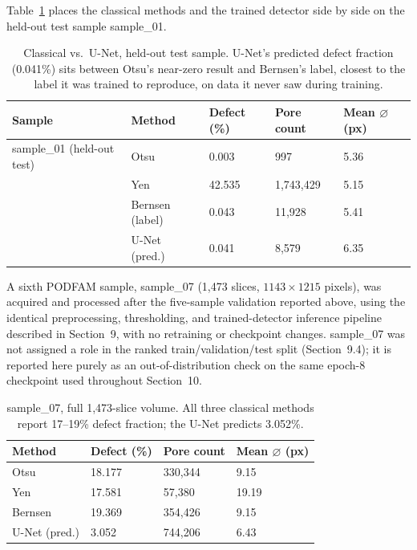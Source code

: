 Table~\ref{tab:podfam_unified} places the classical methods and the trained detector side by side on
the held-out test sample sample\_01.

\begin{table}[htbp]
\centering
\caption{Classical vs.\ U-Net, held-out test sample. U-Net's predicted defect fraction (0.041\%)
  sits between Otsu's near-zero result and Bernsen's label, closest to the label it was trained to
  reproduce, on data it never saw during training.}
\label{tab:podfam_unified}
\begin{tabular}{lllll}
\toprule
\textbf{Sample} & \textbf{Method} & \textbf{Defect (\%)} & \textbf{Pore count} & \textbf{Mean $\varnothing$ (px)} \\
\midrule
sample\_01 (held-out test) & Otsu             & 0.003  & 997       & 5.36 \\
                            & Yen              & 42.535 & 1,743,429 & 5.15 \\
                            & Bernsen (label)  & 0.043  & 11,928    & 5.41 \\
                            & U-Net (pred.)    & 0.041  & 8,579     & 6.35 \\
\bottomrule
\end{tabular}
\end{table}

A sixth PODFAM sample, sample\_07 (1,473 slices, $1143\times1215$ pixels), was acquired and processed
after the five-sample validation reported above, using the identical preprocessing, thresholding, and
trained-detector inference pipeline described in Section~9, with no retraining or checkpoint changes.
sample\_07 was not assigned a role in the ranked train/validation/test split (Section~9.4); it is
reported here purely as an out-of-distribution check on the same epoch-8 checkpoint used throughout
Section~10.

\begin{table}[htbp]
\centering
\caption{sample\_07, full 1,473-slice volume. All three classical methods report 17--19\% defect
  fraction; the U-Net predicts 3.052\%.}
\label{tab:sample07_classical}
\begin{tabular}{llll}
\toprule
\textbf{Method} & \textbf{Defect (\%)} & \textbf{Pore count} & \textbf{Mean $\varnothing$ (px)} \\
\midrule
Otsu           & 18.177 & 330,344 & 9.15 \\
Yen            & 17.581 & 57,380  & 19.19 \\
Bernsen        & 19.369 & 354,426 & 9.15 \\
U-Net (pred.)  & 3.052  & 744,206 & 6.43 \\
\bottomrule
\end{tabular}
\end{table}

